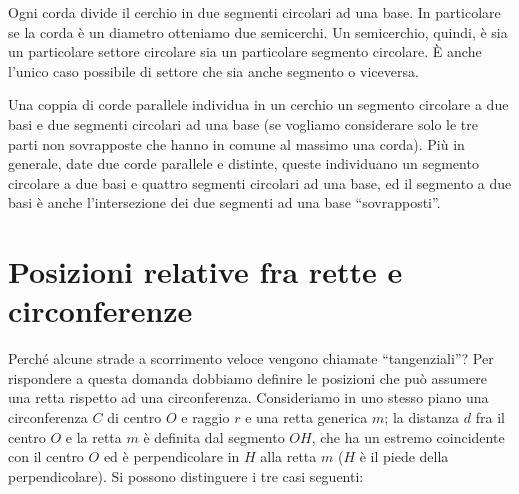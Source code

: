 Ogni corda divide il cerchio in due segmenti circolari ad una base. 
In particolare se la corda è un diametro otteniamo due semicerchi.
Un semicerchio, quindi, è sia un particolare settore circolare sia un 
particolare segmento circolare. \`E anche l'unico caso possibile di 
settore che sia anche segmento o viceversa.

\noindent\begin{minipage}{0.5\textwidth}\parindent15pt
Una coppia di corde parallele individua in un cerchio un segmento 
circolare a due basi e due segmenti circolari ad una base (se 
vogliamo considerare solo le tre parti non sovrapposte che hanno in 
comune al massimo una corda). Più in generale, date due corde 
parallele e distinte, queste individuano un segmento circolare a due 
basi e quattro segmenti circolari ad una base, ed il segmento a due 
basi è anche l'intersezione dei due segmenti ad una base 
``sovrapposti''.
\end{minipage}\hfil
\begin{minipage}{0.5\textwidth}
  \centering
\end{minipage}

\section{Posizioni relative fra rette e 
circonferenze}\label{sect:posizioni_rette_circonferenze}

Perché alcune strade a scorrimento veloce vengono chiamate 
``tangenziali''?
Per rispondere a questa domanda dobbiamo definire le posizioni che 
può assumere una retta rispetto ad una circonferenza.
Consideriamo in uno stesso piano una circonferenza $C$ di centro $O$ 
e raggio $r$ e una retta generica $m$; la distanza $d$ fra il centro 
$O$ e la retta $m$ è definita dal segmento $OH$, che ha un estremo 
coincidente con il centro $O$ ed è perpendicolare in $H$ alla retta 
$m$ ($H$ è il piede della perpendicolare). Si possono distinguere i 
tre casi seguenti:\vspace{4pt}

